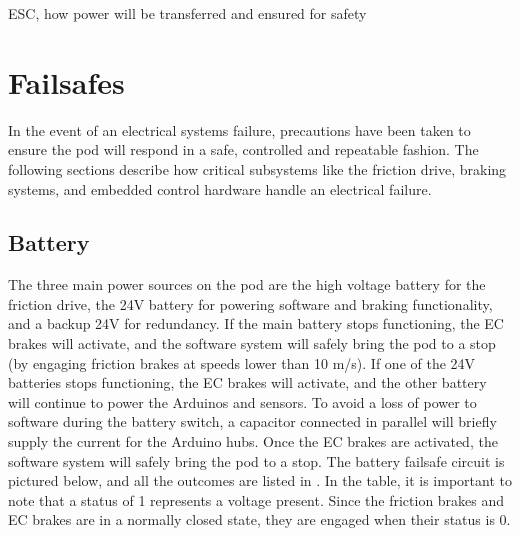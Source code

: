 \documentclass[main.tex]{subfiles}
\begin{document}
    ESC, how power will be transferred and ensured for safety

    \section{Failsafes}
    In the event of an electrical systems failure, precautions have been taken to ensure the pod will respond in a safe, controlled and repeatable fashion. The following sections describe how critical subsystems like the friction drive, braking systems, and embedded control hardware handle an electrical failure.
    \subsection{Battery}
    The three main power sources on the pod are the high voltage battery for the friction drive, the 24V battery for powering software and braking functionality, and a backup 24V for redundancy.  If the main battery stops functioning, the EC brakes will activate, and the software system will safely bring the pod to a stop (by engaging friction brakes at speeds lower than 10 m/s). If one of the 24V batteries stops functioning, the EC brakes will activate, and the other battery will continue to power the Arduinos and sensors. To avoid a loss of power to software during the battery switch, a capacitor connected in parallel will briefly supply the current for the Arduino hubs. Once the EC brakes are activated, the software system will safely bring the pod to a stop. The battery failsafe circuit is pictured below, and all the outcomes are listed in . In the table, it is important to note that a status of 1 represents a voltage present. Since the friction brakes and EC brakes are in a normally closed state, they are engaged when their status is 0.
    
\end{document}
